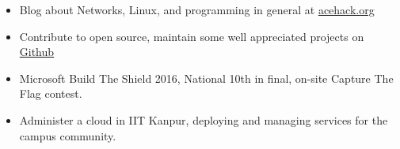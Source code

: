 
{\fontsize{11pt}{1em}\bodyfontlight\upshape\color{text}
\begin{itemize}
  \itemsep-0.3em
  \item Blog about Networks, Linux, and programming in
    general at \href{http://acehack.org}{acehack.org}
  \item Contribute to open source, maintain some well appreciated
    projects on \href{https://github.com/sakshamsharma}{Github}
  \item Microsoft Build The Shield 2016, National 10th in final,
    on-site Capture The Flag contest.
  \item Administer a cloud in IIT Kanpur, deploying and managing services for the campus community.
\end{itemize}
}

